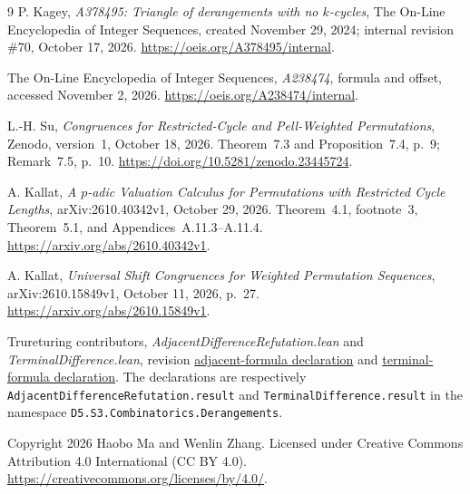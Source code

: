 \documentclass[11pt]{article}
\begin{document}
\begin{thebibliography}{9}
 P. Kagey, \emph{A378495: Triangle of derangements with no
$k$-cycles}, The On-Line Encyclopedia of Integer Sequences, created
November 29, 2024; internal revision \#70, October 17, 2026.
\url{https://oeis.org/A378495/internal}.

 The On-Line Encyclopedia of Integer Sequences,
\emph{A238474}, formula and offset, accessed November 2, 2026.
\url{https://oeis.org/A238474/internal}.

 L.-H. Su, \emph{Congruences for Restricted-Cycle and
Pell-Weighted Permutations}, Zenodo, version~1, October 18, 2026.
Theorem~7.3 and Proposition~7.4, p.~9; Remark~7.5, p.~10.
\url{https://doi.org/10.5281/zenodo.23445724}.

 A. Kallat, \emph{A $p$-adic Valuation Calculus for
Permutations with Restricted Cycle Lengths}, arXiv:2610.40342v1,
October 29, 2026. Theorem~4.1, footnote~3, Theorem~5.1,
and Appendices~A.11.3--A.11.4.
\url{https://arxiv.org/abs/2610.40342v1}.

 A. Kallat, \emph{Universal Shift Congruences for Weighted
Permutation Sequences}, arXiv:2610.15849v1, October 11, 2026, p.~27.
\url{https://arxiv.org/abs/2610.15849v1}.

 Trureturing contributors, \emph{AdjacentDifferenceRefutation.lean}
and \emph{TerminalDifference.lean}, revision
\href{https://github.com/the-omega-institute/trureturing/blob/cdafeab0d44da2b6840cfc802535d2f94a146fad/D5/S3/Combinatorics/Derangements/AdjacentDifferenceRefutation.lean}{adjacent-formula declaration}
and
\href{https://github.com/the-omega-institute/trureturing/blob/cdafeab0d44da2b6840cfc802535d2f94a146fad/D5/S3/Combinatorics/Derangements/TerminalDifference.lean}{terminal-formula declaration}.
The declarations are respectively \texttt{AdjacentDifferenceRefutation.result}
and \texttt{TerminalDifference.result} in the namespace
\texttt{D5.S3.Combinatorics.Derangements}.
\end{thebibliography}

\smallskip
\noindent\small Copyright 2026 Haobo Ma and Wenlin Zhang.
Licensed under Creative Commons Attribution 4.0 International (CC BY 4.0).
\url{https://creativecommons.org/licenses/by/4.0/}.
\end{document}
